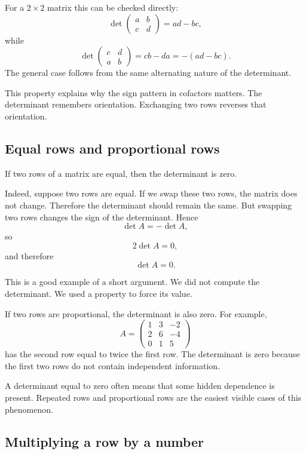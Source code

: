 For a \(2\times2\) matrix this can be checked directly:
\[
\det\begin{pmatrix}a&b\\c&d\end{pmatrix}=ad-bc,
\]
while
\[
\det\begin{pmatrix}c&d\\a&b\end{pmatrix}=cb-da=-(ad-bc).
\]
The general case follows from the same alternating nature of the determinant.

This property explains why the sign pattern in cofactors matters. The determinant remembers orientation. Exchanging two rows reverses that orientation.

\subsection{Equal rows and proportional rows}

If two rows of a matrix are equal, then the determinant is zero.

Indeed, suppose two rows are equal. If we swap these two rows, the matrix does not change. Therefore the determinant should remain the same. But swapping two rows changes the sign of the determinant. Hence
\[
\det A=-\det A,
\]
so
\[
2\det A=0,
\]
and therefore
\[
\det A=0.
\]

This is a good example of a short argument. We did not compute the determinant. We used a property to force its value.

If two rows are proportional, the determinant is also zero. For example,
\[
A=\begin{pmatrix}
1&3&-2\\
2&6&-4\\
0&1&5
\end{pmatrix}
\]
has the second row equal to twice the first row. The determinant is zero because the first two rows do not contain independent information.

\begin{remarkbox}
A determinant equal to zero often means that some hidden dependence is present. Repeated rows and proportional rows are the easiest visible cases of this phenomenon.
\end{remarkbox}

\subsection{Multiplying a row by a number}

